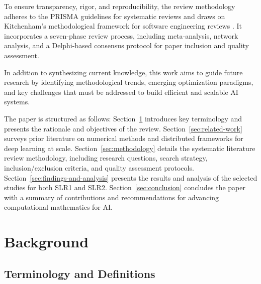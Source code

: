 \documentclass[acmsmall]{acmart}
\begin{document}
To ensure transparency, rigor, and reproducibility, the review methodology adheres to the PRISMA guidelines for 
systematic reviews \citep{moher2009preferred} and draws on Kitchenham’s methodological framework for software 
engineering reviews \citep{kitchenham2007guidelines}. It incorporates a seven-phase review process, including meta-analysis, network analysis, 
and a Delphi-based consensus protocol for paper inclusion and quality assessment.

In addition to synthesizing current knowledge, this work aims to guide future research by identifying methodological trends, emerging optimization paradigms, 
and key challenges that must be addressed to build efficient and scalable AI systems.


The paper is structured as follows: Section~\ref{sec:background} introduces key terminology and presents the rationale and objectives of the review. 
Section~\ref{sec:related-work} surveys prior literature on numerical methods and distributed frameworks for deep learning at scale. 
Section~\ref{sec:methodology} details the systematic literature review methodology, including research questions, search strategy, inclusion/exclusion criteria,
 and quality assessment protocols. 
Section~\ref{sec:findings-and-analysis} presents the results and analysis of the selected studies for both SLR1 and SLR2. 
Section~\ref{sec:conclusion} concludes the paper with a summary of contributions and recommendations for advancing computational mathematics for AI.


\section{Background}\label{sec:background}

\subsection{Terminology and Definitions}\label{subsec:terminology-and-definitions}
\end{document}

